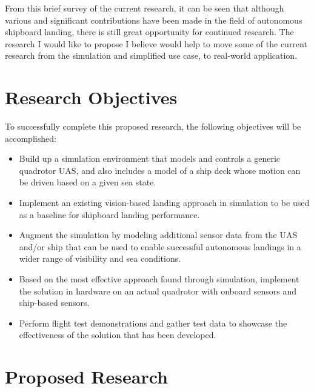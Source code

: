 \documentclass[12pt, letterpaper]{article}
\begin{document}
From this brief survey of the current research, it can be seen that although various and significant contributions have been made in the field of autonomous shipboard landing, there is still great opportunity for continued research.  The research I would like to propose I believe would help to move some of the current research from the simulation and simplified use case, to real-world application.

\section{Research Objectives}

To successfully complete this proposed research, the following objectives will be accomplished:


\begin{itemize}

	\item Build up a simulation environment that models and controls a generic quadrotor UAS, and also includes a model of a ship deck whose motion can be driven based on a given sea state.

	\item Implement an existing vision-based landing approach in simulation to be used as a baseline for shipboard landing performance.  

	\item Augment the simulation by modeling additional sensor data from the UAS and/or ship that can be used to enable successful autonomous landings in a wider range of visibility and sea conditions.

	\item Based on the most effective approach found through simulation, implement the solution in hardware on an actual quadrotor with onboard sensors and ship-based sensors.
	
	\item Perform flight test demonstrations and gather test data to showcase the effectiveness of the solution that has been developed.

\end{itemize}

\section{Proposed Research}
\end{document}
